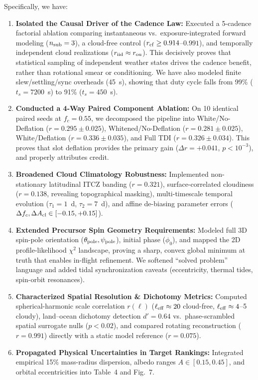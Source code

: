 \documentclass[11pt]{article}
\begin{document}
Specifically, we have:
\begin{enumerate}
\item \textbf{Isolated the Causal Driver of the Cadence Law:} Executed a 5-cadence factorial ablation comparing instantaneous vs.\ exposure-integrated forward modeling ($n_{\rm sub}=3$), a cloud-free control ($r_{\rm cf} \ge 0.914$--$0.991$), and temporally independent cloud realizations ($r_{\rm iid} \approx r_{\rm ou}$). This decisively proves that statistical sampling of independent weather states drives the cadence benefit, rather than rotational smear or conditioning. We have also modeled finite slew/settling/sync overheads (45~s), showing that duty cycle falls from 99\% ($t_s=7200$~s) to 91\% ($t_s=450$~s).
\item \textbf{Conducted a 4-Way Paired Component Ablation:} On 10 identical paired seeds at $f_c=0.55$, we decomposed the pipeline into White/No-Deflation ($r=0.295\pm0.025$), Whitened/No-Deflation ($r=0.281\pm0.025$), White/Deflation ($r=0.336\pm0.035$), and Full TDI ($r=0.326\pm0.034$). This proves that slot deflation provides the primary gain ($\Delta r = +0.041$, $p < 10^{-3}$), and properly attributes credit.
\item \textbf{Broadened Cloud Climatology Robustness:} Implemented non-stationary latitudinal ITCZ banding ($r=0.321$), surface-correlated cloudiness ($r=0.138$, revealing topographical masking), multi-timescale temporal evolution ($\tau_1=1$~d, $\tau_2=7$~d), and affine de-biasing parameter errors ($\Delta f_c, \Delta A_{\rm cl} \in [-0.15, +0.15]$).
\item \textbf{Extended Precursor Spin Geometry Requirements:} Modeled full 3D spin-pole orientation ($\theta_{\rm pole}, \psi_{\rm pole}$), initial phase ($\phi_0$), and mapped the 2D profile-likelihood $\chi^2$ landscape, proving a sharp, convex global minimum at truth that enables in-flight refinement. We softened ``solved problem'' language and added tidal synchronization caveats (eccentricity, thermal tides, spin-orbit resonances).
\item \textbf{Characterized Spatial Resolution \& Dichotomy Metrics:} Computed spherical-harmonic scale correlation $r(\ell)$ ($\ell_{\rm eff}\approx20$ cloud-free, $\ell_{\rm eff}\approx4$--5 cloudy), land--ocean dichotomy detection $d'=0.64$ vs.\ phase-scrambled spatial surrogate nulls ($p<0.02$), and compared rotating reconstruction ($r=0.991$) directly with a static model reference ($r=0.075$).
\item \textbf{Propagated Physical Uncertainties in Target Rankings:} Integrated empirical 15\% mass-radius dispersion, albedo ranges $A\in[0.15,0.45]$, and orbital eccentricities into Table~4 and Fig.~7.

\end{enumerate}
\end{document}
